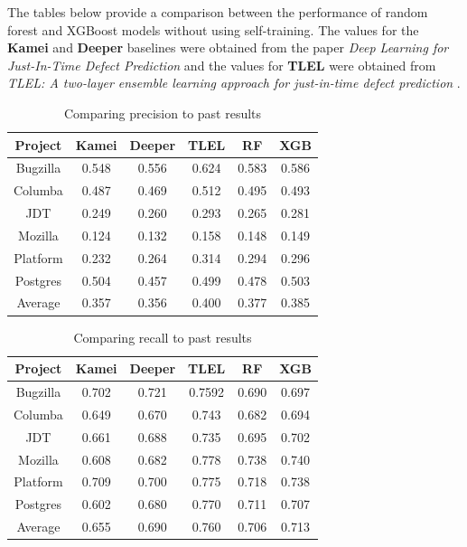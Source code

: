 \documentclass[../main.tex]{subfiles}
\begin{document}
The tables below provide a comparison between the performance of random forest and XGBoost models without using self-training. The values for the \textbf{Kamei} and \textbf{Deeper} baselines were obtained from the paper \textit{Deep Learning for Just-In-Time Defect Prediction} \cite{yang2015deep} and the values for \textbf{TLEL} were obtained from \textit{TLEL: A two-layer ensemble learning approach for just-in-time defect prediction} \cite{yang2017tlel}.

\begin{table}[H] 
\centering 
\begin{tabular}{|c c c c c c|} 
\hline 
Project  & Kamei& Deeper & TLEL   & RF & XGB \\ 
\hline \hline 
Bugzilla & 0.548 & 0.556 & 0.624 & 0.583 & 0.586\\ 
\hline 
Columba  & 0.487 & 0.469 & 0.512 & 0.495 & 0.493\\ 
\hline 
JDT      & 0.249 & 0.260 & 0.293 & 0.265 & 0.281\\ 
\hline 
Mozilla  & 0.124 & 0.132 & 0.158 & 0.148 & 0.149\\ 
\hline 
Platform & 0.232 & 0.264 & 0.314 & 0.294 & 0.296\\ 
\hline 
Postgres & 0.504 & 0.457 & 0.499 & 0.478 & 0.503\\ 
\hline 
Average  & 0.357 & 0.356 & 0.400 & 0.377 & 0.385\\ 
\hline 
\end{tabular} 
\caption{Comparing precision to past results} 
\label{table:exp4_Precision} 
\end{table} 



\begin{table}[H] 
\centering 
\begin{tabular}{|c c c c c c|} 
\hline 
Project & Kamei & Deeper & TLEL & RF & XGB\\ 
\hline \hline 
Bugzilla & 0.702 & 0.721 & 0.7592 & 0.690 & 0.697\\ 
\hline 
Columba & 0.649 & 0.670 & 0.743 & 0.682 & 0.694\\ 
\hline 
JDT & 0.661 & 0.688  & 0.735 & 0.695 & 0.702\\ 
\hline 
Mozilla & 0.608 & 0.682  & 0.778 & 0.738 & 0.740\\ 
\hline 
Platform & 0.709 & 0.700 & 0.775 & 0.718 & 0.738\\ 
\hline 
Postgres & 0.602 & 0.680  & 0.770 & 0.711 & 0.707\\ 
\hline 
Average & 0.655 & 0.690  & 0.760  & 0.706 & 0.713 \\ 
\hline 
\end{tabular} 
\caption{Comparing recall to past results} 
\label{table:exp4_Recall} 
\end{table} 
\end{document}
